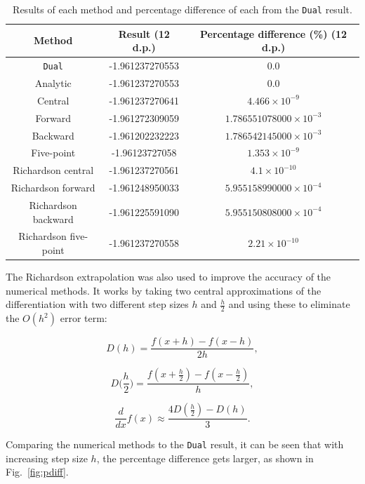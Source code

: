 \documentclass[11pt,a4paper]{article}
\begin{document}
\begin{table}
    \centering
    \begin{tabular}{c|c|c}
        Method & Result (12 d.p.) & Percentage difference (\%) (12 d.p.)\\
        \hline
        \texttt{Dual} & -1.961237270553 & $0.0$\\
        Analytic & -1.961237270553 & $0.0$\\
        \hline
        Central & -1.961237270641 & $4.466\times 10^{-9}$\\
        Forward & -1.961272309059 & $1.786551078000\times 10^{-3}$\\
        Backward & -1.961202232223 & $1.786542145000 \times 10^{-3}$\\
        Five-point & -1.96123727058 & $1.353\times 10^{-9}$\\
        \hline
        Richardson central & -1.961237270561 & $4.1\times 10^{-10}$\\
        Richardson forward & -1.961248950033 & $5.955158990000\times 10^{-4}$\\
        Richardson backward & -1.961225591090 & $5.955150808000\times 10^{-4}$\\
        Richardson five-point & -1.961237270558 & $2.21\times 10^{-10}$
    \end{tabular}
    \caption{Results of each method and percentage difference of each from the \texttt{Dual} result.}
    \label{tab:diffs}
\end{table}



The Richardson extrapolation was also used to improve the accuracy of the numerical methods. It works by taking two central approximations of the differentiation with two different step sizes $h$ and $\frac{h}{2}$ and using these to eliminate the $O(h^2)$ error term:

\begin{equation}
    D(h) = \frac{f(x+h) - f(x-h)}{2h}, 
\end{equation}

\begin{equation}
    D\biggl(\frac{h}{2}\biggr) = \frac{f(x+\frac{h}{2}) - f(x-\frac{h}{2})}{h}, 
\end{equation}

\begin{equation}
    \frac{d}{dx} f(x) \approx \frac{4 D(\frac{h}{2}) - D(h)}{3}.
\end{equation}

Comparing the numerical methods to the \texttt{Dual} result, it can be seen that with increasing step size $h$, the percentage difference gets larger, as shown in Fig.~\ref{fig:pdiff}.
\end{document}
